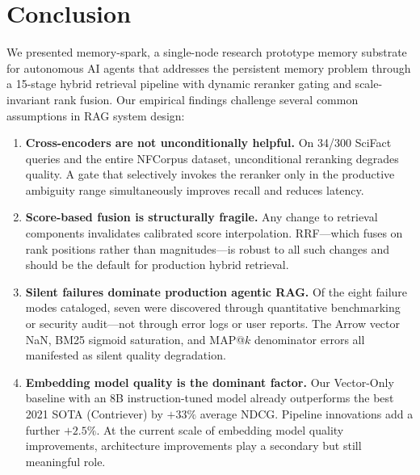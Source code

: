 \documentclass[11pt]{article}
\begin{document}
\section{Conclusion}
\label{sec:conclusion}

We presented memory-spark, a single-node research prototype memory substrate for autonomous AI agents that
addresses the persistent memory problem through a 15-stage hybrid retrieval pipeline with
dynamic reranker gating and scale-invariant rank fusion. Our empirical findings challenge
several common assumptions in RAG system design:

\begin{enumerate}[leftmargin=2em, itemsep=4pt]
  \item \textbf{Cross-encoders are not unconditionally helpful.} On 34/300 SciFact queries
  and the entire NFCorpus dataset, unconditional reranking degrades quality. A gate that
  selectively invokes the reranker only in the productive ambiguity range simultaneously
  improves recall and reduces latency.

  \item \textbf{Score-based fusion is structurally fragile.} Any change to retrieval
  components invalidates calibrated score interpolation. RRF---which fuses on rank
  positions rather than magnitudes---is robust to all such changes and should be the
  default for production hybrid retrieval.

  \item \textbf{Silent failures dominate production agentic RAG.} Of the eight failure
  modes cataloged, seven were discovered through quantitative benchmarking or security
  audit---not through error logs or user reports. The Arrow vector NaN, BM25 sigmoid
  saturation, and MAP@$k$ denominator errors all manifested as silent quality degradation.

  \item \textbf{Embedding model quality is the dominant factor.} Our Vector-Only baseline
  with an 8B instruction-tuned model already outperforms the best 2021 SOTA (Contriever)
  by $+33\%$ average NDCG. Pipeline innovations add a further $+2.5\%$. At the current
  scale of embedding model quality improvements, architecture improvements play a secondary
  but still meaningful role.

\end{enumerate}
\end{document}
